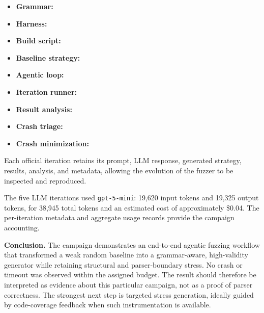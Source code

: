 \documentclass[10pt,a4paper]{article}
\begin{document}
\begin{itemize}
    \item \textbf{Grammar:} 
    \item \textbf{Harness:} 
    \item \textbf{Build script:} 
    \item \textbf{Baseline strategy:} 
    \item \textbf{Agentic loop:} 
    \item \textbf{Iteration runner:} 
    \item \textbf{Result analysis:} 
    \item \textbf{Crash triage:} 
    \item \textbf{Crash minimization:} 
\end{itemize}

Each official iteration retains its prompt, LLM response, generated strategy,
results, analysis, and metadata, allowing the evolution of the fuzzer to be
inspected and reproduced.

The five LLM iterations used \texttt{gpt-5-mini}: 19,620 input tokens
and 19,325 output tokens, for 38,945 total tokens and an estimated cost
of approximately \$0.04. The per-iteration metadata and aggregate usage records provide the campaign accounting.

\textbf{Conclusion.}
The campaign demonstrates an end-to-end agentic fuzzing workflow that transformed a weak random baseline into a grammar-aware,
high-validity generator while retaining structural and parser-boundary stress. No crash or timeout was observed within the assigned
budget. The result should therefore be interpreted as evidence about this particular campaign, not as a proof of parser correctness.
The strongest next step is targeted stress generation, ideally guided by code-coverage feedback when such instrumentation is available.
\end{document}
